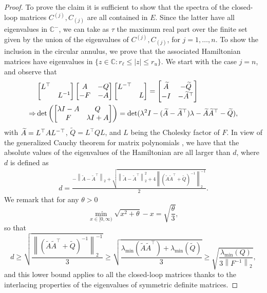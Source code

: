 \documentclass[a4paper,10pt]{article}
\newcommand{\norm}[1]{\left\lVert#1\right\rVert}
\newcommand{\upd}[1]{{\color{black}#1}} %
\begin{document}
\begin{proof}
	To prove the claim it is sufficient to show that the spectra of the closed-loop matrices $C^{(j)},C_{(j)}$ are all contained in $E$. Since the latter have all eigenvalues in $\mathbb C^-$, we can take as $\tau$ the maximum real part over the finite set given by the union of the eigenvalues of $C^{(j)},C_{(j)}$, for $j=1,\dots,n$. 
	To show the inclusion in the circular annulus, we prove that the associated Hamiltonian matrices have eigenvalues in $\{z\in\mathbb C: r_\ell\le|z|\le r_u\}$. We start with the case $j=n$, and observe that
	\begin{align*}
		&\begin{bmatrix}
			L^\top\\ &L^{-1}
		\end{bmatrix}
		\begin{bmatrix}
			A &-Q\\
			-F&-A
		\end{bmatrix}
		\begin{bmatrix}
			L^{-\upd{\top}}\\ &L
		\end{bmatrix}=\begin{bmatrix}
			\widetilde A &-\widetilde Q\\
			-I&-\widetilde A^\top
		\end{bmatrix}\\
		\Rightarrow& \det\left(\begin{bmatrix}
			\lambda I-A &Q\\
			F&\lambda I+A
		\end{bmatrix}\right)=\det(\lambda^2I-(\widetilde A-\widetilde A^\top)\lambda -\widetilde A\widetilde A^\top-\widetilde Q),
	\end{align*}
	with $\widetilde A=L^\top AL^{-\upd{\top}}$, $\widetilde Q=L^\top QL$, and $L$ \upd{being the} Cholesky factor of $F$. In view of the generalized Cauchy theorem for matrix polynomials \cite[Theorem 3.4]{melman2013generalization}, we have that the absolute values of the eigenvalues of the Hamiltonian are all larger than $d$, where $d$ is defined as
	\begin{align*}
		d=\frac{-\norm{\widetilde A-\widetilde A^\top}_2+\sqrt{\norm{\widetilde A-\widetilde A^\top}_2^2+4\norm{(\widetilde A\widetilde A^\top+\widetilde Q)^{-1}}_2^{-1}}}2.
	\end{align*}
	We remark that for any $\theta >0$
	$$
	\min_{x\in [0,\infty)}\sqrt{x^2+\theta}-x=\sqrt{\frac{\theta}{3}},
	$$
	so that
	$$
	d\ge \sqrt{\frac{\norm{(\widetilde A\widetilde A^\top+\widetilde Q)^{-1}}_2^{-1}}{3}}\ge\sqrt{\frac{\lambda_{\min}(\widetilde A\widetilde A^\top)+\lambda_{\min}(\widetilde Q)}{3}}\ge \sqrt{\frac{\lambda_{\min}(Q)}{3\norm{F^{-1}}_2}},
	$$
	and this lower bound applies to all the closed-loop matrices thanks to the interlacing properties of the eigenvalues of symmetric definite matrices.
	

\end{proof}
\end{document}
